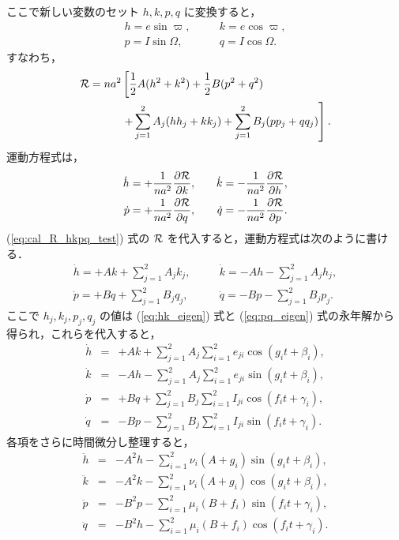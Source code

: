\documentclass[11pt,a4paper,oneside,onecolumn]{jarticle}
\begin{document}
ここで新しい変数のセット $h, k, p, q$ に変換すると，
\begin{eqnarray}
h = e \sin \varpi, & \quad & k = e \cos \varpi, \\
p = I \sin \Omega, & \quad & q = I \cos \Omega.
\end{eqnarray}
すなわち，
\begin{equation}
\begin{split}
{\cal R} = n a^2 & \left[ \frac{1}{2} A (h^2 + k^2) + \frac{1}{2} B (p^2 + q^2) \right. \\
& \left. + \sum_{j = 1}^2 A_j (h h_j + k k_j) + \sum_{j = 1}^2 B_j (p p_j + q q_j) \right]. \\
\end{split} \label{eq:cal_R_hkpq_test}
\end{equation} 
運動方程式は，
\begin{eqnarray}
\dot{h} = + \frac{1}{n a^2} \frac{\partial {\cal R}}{\partial k}, & \quad & \dot{k} = - \frac{1}{n a^2} \frac{\partial {\cal R}}{\partial h}, \\
\dot{p} = + \frac{1}{n a^2} \frac{\partial {\cal R}}{\partial q}, & \quad & \dot{q} = - \frac{1}{n a^2} \frac{\partial {\cal R}}{\partial p}.
\end{eqnarray}
(\ref{eq:cal_R_hkpq_test}) 式の ${\cal R}$ を代入すると，運動方程式は次のように書ける．
\begin{eqnarray}
\dot{h} = + A k + \sum_{j = 1}^2 A_j k_j, & \quad & \dot{k} = - A h - \sum_{j = 1}^2 A_j h_j, \\
\dot{p} = + B q + \sum_{j = 1}^2 B_j q_j, & \quad & \dot{q} = - B p - \sum_{j = 1}^2 B_j p_j.
\end{eqnarray}
ここで $h_j, k_j, p_j, q_j$ の値は (\ref{eq:hk_eigen}) 式と (\ref{eq:pq_eigen}) 式の永年解から得られ，これらを代入すると，
\begin{eqnarray}
\dot{h} & = & + A k + \sum_{j = 1}^2 A_j \sum_{i = 1}^2 e_{ji} \cos (g_i t + \beta_i), \\
\dot{k} & = & - A h - \sum_{j = 1}^2 A_j \sum_{i = 1}^2 e_{ji} \sin (g_i t + \beta_i), \\
\dot{p} & = & + B q + \sum_{j = 1}^2 B_j \sum_{i = 1}^2 I_{ji} \cos (f_i t + \gamma_i), \\
\dot{q} & = & - B p - \sum_{j = 1}^2 B_j \sum_{i = 1}^2 I_{ji} \sin (f_i t + \gamma_i).
\end{eqnarray}
各項をさらに時間微分し整理すると，
\begin{eqnarray}
\ddot{h} & = & - A^2 h - \sum_{i = 1}^2 \nu_i (A + g_i) \sin (g_i t + \beta_i), \\
\ddot{k} & = & - A^2 k - \sum_{i = 1}^2 \nu_i (A + g_i) \cos (g_i t + \beta_i), \\
\ddot{p} & = & - B^2 p - \sum_{i = 1}^2 \mu_i (B + f_i) \sin (f_i t + \gamma_i), \\
\ddot{q} & = & - B^2 h - \sum_{i = 1}^2 \mu_i (B + f_i) \cos (f_i t + \gamma_i).
\end{eqnarray}
\end{document}
